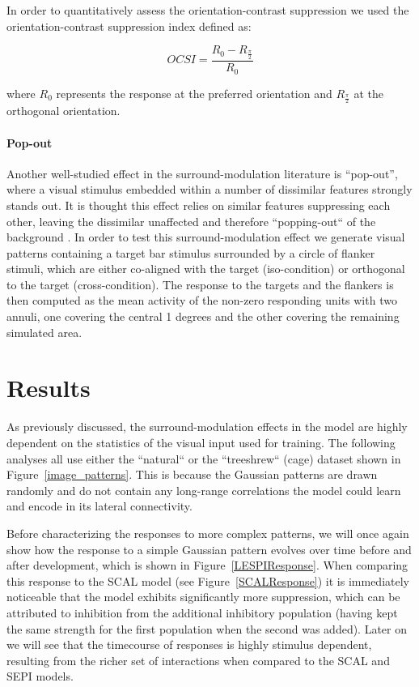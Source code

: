 In order to quantitatively assess the orientation-contrast suppression
we used the orientation-contrast suppression index defined as:

\begin{equation}
  OCSI = \frac{R_0 - R_{\frac{\pi}{2}}}{R_0}
\end{equation}

where $R_0$ represents the response at the preferred orientation and
$R_{\frac{\pi}{2}}$ at the orthogonal orientation.

\paragraph{Pop-out}

Another well-studied effect in the surround-modulation
literature is ``pop-out'', where a visual stimulus 
embedded within a number of dissimilar features strongly stands
out. It is thought this effect relies on similar features suppressing
each other, leaving the dissimilar unaffected and therefore
``popping-out`` of the background \citep{Kastner1997}. In order to
test this surround-modulation effect we generate visual patterns
containing a target bar stimulus surrounded by a circle of flanker
stimuli, which are either co-aligned with the target (iso-condition)
or orthogonal to the target (cross-condition).
The response to the targets and the flankers is then computed as the
mean activity of the non-zero responding units with two annuli, one
covering the central 1 degrees and the other covering the remaining
simulated area.

\section{Results}

As previously discussed, the surround-modulation effects in the model
are highly dependent on the statistics of the visual input used for
training. The following analyses all use either the ``natural`` or the
``treeshrew`` (cage) dataset shown in
Figure~\ref{image_patterns}. This is because the Gaussian patterns are
drawn randomly and do not contain any long-range correlations the
model could learn and encode in its lateral connectivity.

Before characterizing the responses to more complex patterns, we will
once again show how the response to a simple Gaussian pattern evolves
over time before and after development, which is shown in
Figure~\ref{LESPIResponse}. When comparing this response to the SCAL
model (see Figure~\ref{SCALResponse}) it is immediately noticeable
that the model exhibits significantly more suppression, which can be
attributed to inhibition from the additional inhibitory population
(having kept the same strength for the first population when the
second was added). Later on we will see that the timecourse of
responses is highly stimulus dependent, resulting from the richer set
of interactions when compared to the SCAL and SEPI models.

